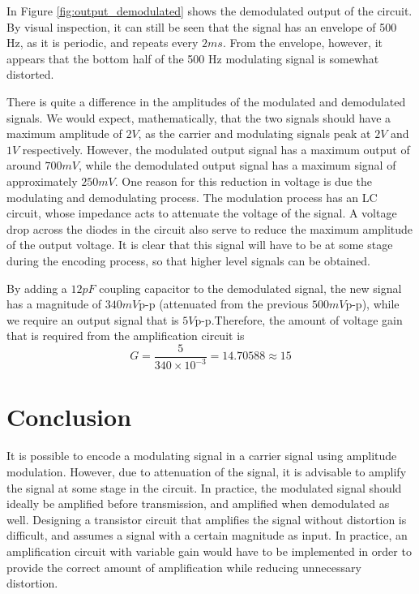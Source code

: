 \documentclass[12pt, a4paper]{article}
\begin{document}
	In Figure \ref{fig:output_demodulated} shows the demodulated output of the circuit. By visual inspection, it can still be seen that the signal has an envelope of 500 Hz, as it is periodic, and repeats every $2ms$. From the envelope, however, it appears that the bottom half of the 500 Hz modulating signal is somewhat distorted.\linebreak

	There is quite a difference in the amplitudes of the modulated and demodulated signals. We would expect, mathematically, that the two signals should have a maximum amplitude of $2V$, as the carrier and modulating signals peak at $2V$ and $1V$ respectively. However, the modulated output signal has a maximum output of around $700mV$, while the demodulated output signal has a maximum signal of approximately $250mV$. One reason for this reduction in voltage is due the modulating and demodulating process. The modulation process has an LC circuit, whose impedance acts to attenuate the voltage of the signal. A voltage drop across the diodes in the circuit also serve to reduce the maximum amplitude of the output voltage. It is clear that this signal will have to be at some stage during the encoding process, so that higher level signals can be obtained.

	By adding a $12pF$ coupling capacitor to the demodulated signal, the new signal has a magnitude of $340mV$p-p (attenuated from the previous $500mV$\mbox{p-p}), while we require an output signal that is $5V$p-p.Therefore, the amount of voltage gain that is required from the amplification circuit is
	\[
		G = \frac{5}{340\times 10^{-3}} = 14.70588 \approx 15
	\]

\section{Conclusion} %
\label{sec:conclusion}
	It is possible to encode a modulating signal in a carrier signal using amplitude modulation. However, due to attenuation of the signal, it is advisable to amplify the signal at some stage in the circuit. In practice, the modulated signal should ideally be amplified before transmission, and amplified when demodulated as well. Designing a transistor circuit that amplifies the signal without distortion is difficult, and assumes a signal with a certain magnitude as input. In practice, an amplification circuit with variable gain would have to be implemented in order to provide the correct amount of amplification while reducing unnecessary distortion.
\end{document}
